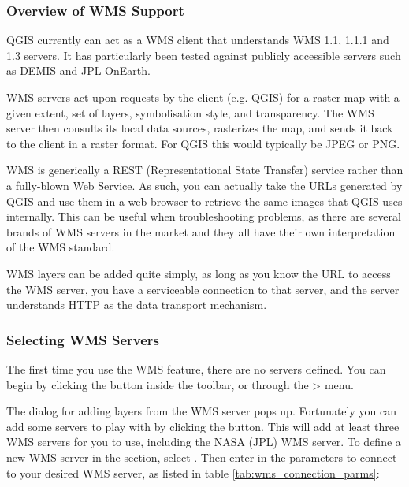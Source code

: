 \subsubsection{Overview of WMS Support}\label{sec:ogc-wms-about}

QGIS currently can act as a WMS client that understands WMS 1.1, 1.1.1 and 1.3
servers.  It has particularly been tested against publicly accessible servers
such as DEMIS and JPL OnEarth.

WMS servers act upon requests by the client (e.g. QGIS) for a raster map with
a given extent, set of layers, symbolisation style, and transparency.  The WMS
server then consults its local data sources, rasterizes the map, and sends
it back to the client in a raster format.  For QGIS this would typically
be JPEG or PNG.

WMS is generically a REST (Representational State Transfer) service rather than
a fully-blown Web Service.  As such, you can actually take the URLs generated by
QGIS and use them in a web browser to retrieve the same images that QGIS uses
internally.  This can be useful when troubleshooting problems, as there are
several brands of WMS servers in the market and they all have their own
interpretation of the WMS standard.

WMS layers can be added quite simply, as long as you know the URL to access
the WMS server, you have a serviceable connection to that server, and the
server understands HTTP as the data transport mechanism.

\subsubsection{Selecting WMS Servers}\label{sec:ogc-wms-servers}

The first time you use the WMS feature, there are no servers defined. You 
can begin by clicking the  button inside the toolbar, 
or through the > menu.

The dialog  for adding layers from the WMS server pops up. Fortunately you can 
add some servers to play with by clicking the  
button. This will add at least three WMS servers for you to use, including the NASA (JPL) 
WMS server. To define a new WMS server in the  section, 
select . Then enter in the parameters to connect to your desired
WMS server, as listed in table \ref{tab:wms_connection_parms}:

